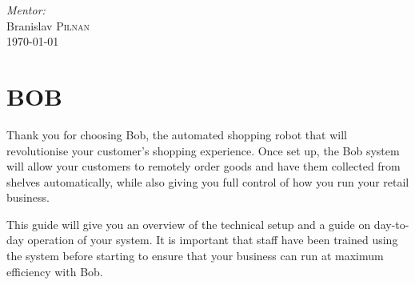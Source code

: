 \documentclass[onecolumn]{IEEEtran}
\begin{document}
\begin{titlepage}

\Large \emph{Mentor:}\\
Branislav \textsc{Pilnan}\\[1cm] 


{\large
\today
}\\[2cm] 

 

\vfill %

\end{titlepage}
\tableofcontents
\newpage
{\chapter{BOB}}
Thank you for choosing Bob, the automated shopping robot that will revolutionise your customer’s shopping experience. Once set up, the Bob system will allow your customers to remotely order goods and have them collected from shelves automatically, while also giving you full control of how you run your retail business.
\par This guide will give you an overview of the technical setup and a guide on day-to-day operation of your system. It is important that staff have been trained using the system before starting to ensure that your business can run at maximum efficiency with Bob.
\end{document}
